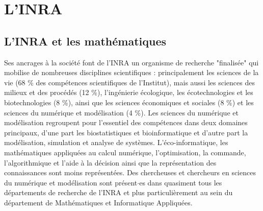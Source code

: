  
 
 \chapter{L'INRA}
 
 \section{L'INRA et les math\'ematiques}

Ses ancrages \`a la soci\'et\'e font de l'INRA un organisme de recherche "finalis\'ee" qui mobilise de nombreuses disciplines scientifiques : principalement les sciences de la vie (68 \% des comp\'etences scientifiques de l'Institut), mais aussi les sciences des milieux et des proc\'ed\'es (12 \%), l'ing\'enierie \'ecologique, les \'ecotechnologies et les biotechnologies (8 \%), ainsi que les sciences \'economiques et sociales (8 \%) et les sciences du num\'erique et mod\'elisation (4 \%). Les sciences du num\'erique et mod\'elisation regroupent pour l'essentiel des comp\'etences dans deux domaines principaux, d'une part les biostatistiques et bioinformatique et d'autre part la mod\'elisation, simulation et analyse de syst\`emes. L'\'eco-informatique, les math\'ematiques appliqu\'ees au calcul num\'erique, l'optimisation, la commande, l'algorithmique et l'aide \`a la d\'ecision ainsi que la repr\'esentation des connaissances sont moins repr\'esent\'ees. Des chercheuses et chercheurs en sciences du num\'erique et mod\'elisation sont pr\'esent$\cdot$es dans quasiment tous les d\'epartements de  recherche de l'INRA et plus particuli\`erement au sein du d\'epartement de Math\'ematiques et Informatique Appliqu\'ees.

